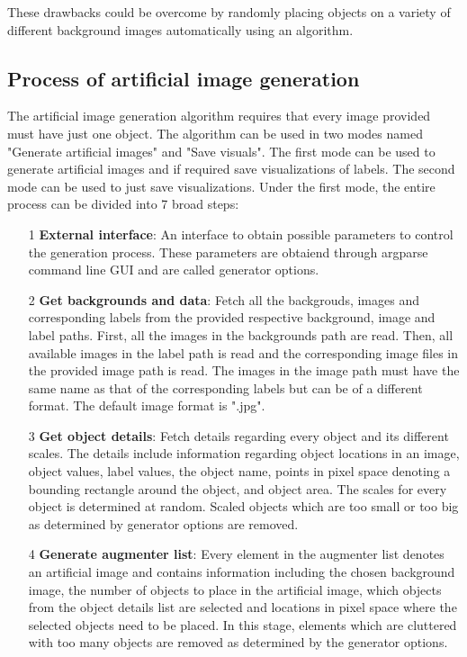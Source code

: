These drawbacks could be overcome by randomly placing objects on a variety of different background images automatically using an algorithm.

\subsection{Process of artificial image generation}
The artificial image generation algorithm requires that every image provided must have just one object. The algorithm can be used in two modes named "Generate artificial images" and "Save visuals". The first mode can be used to generate artificial images and if required save visualizations of labels. The second mode can be used to just save visualizations. Under the first mode, the entire process can be divided into 7 broad steps:
	\begin{itemize}
		\item[1] \textbf{External interface}: An interface to obtain possible parameters to control the generation process. These parameters are obtaiend through argparse command line GUI and are called generator options.
		\item[2] \textbf{Get backgrounds and data}: Fetch all the backgrouds, images and corresponding labels from the provided respective background, image and label paths. First, all the images in the backgrounds path are read. Then, all available images in the label path is read and the corresponding image files in the provided image path is read. The images in the image path must have the same name as that of the corresponding labels but can be of a different format. The default image format is ".jpg".
		\item[3] \textbf{Get object details}: Fetch details regarding every object and its different scales. The details include information regarding object locations in an image, object values, label values, the object name, points in pixel space denoting a bounding rectangle around the object, and object area. The scales for every object is determined at random. Scaled objects which are too small or too big as determined by generator options are removed.
		\item[4] \textbf{Generate augmenter list}: Every element in the augmenter list denotes an artificial image and contains information including the chosen background image, the number of objects to place in the artificial image, which objects from the object details list are selected and locations in pixel space where the selected objects need to be placed. In this stage, elements which are cluttered with too many objects are removed as determined by the generator options.

\end{itemize}

